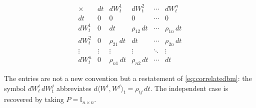 


\[
\begin{array}{c|ccccc}
\times & dt & dW_t^1 & dW_t^2 & \cdots & dW_t^n \\ \hline
dt & 0 & 0 & 0 & \cdots & 0 \\
dW_t^1 & 0 & dt & \rho_{12}\,dt & \cdots & \rho_{1n}\,dt \\
dW_t^2 & 0 & \rho_{21}\,dt & dt & \cdots & \rho_{2n}\,dt \\
\vdots & \vdots & \vdots & \vdots & \ddots & \vdots \\
dW_t^n & 0 & \rho_{n1}\,dt & \rho_{n2}\,dt & \cdots & dt
\end{array}
\]
{%
\label{tab:ItoTable}}

The entries are not a new convention but a restatement of \eqref{eq:correlatedbm}: the symbol 
$dW^i_t\,dW^j_t$ abbreviates $d\langle W^i,W^j\rangle_t = \rho_{ij}\,dt$. The independent case is 
recovered by taking $P = \mathbb{I}_{n\times n}$.

